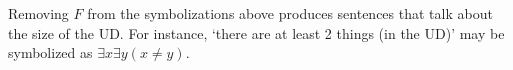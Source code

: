 Removing $F$ from the symbolizations above produces sentences that talk about the size of the UD. For instance, `there are at least 2 things (in the UD)' may be symbolized as $\exists x\exists y(x \neq y)$.


%
%
%


